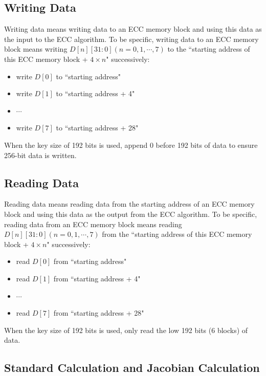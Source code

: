 \documentclass[main\_\_EN.tex]{subfiles}
\begin{document}
\subsection{Writing Data}

Writing data means writing data to an ECC memory block and using this data as the input to the ECC algorithm. To be specific, writing data to an ECC memory block means writing $D[n][31:0] (n=0, 1, \cdots, 7)$ to the ``starting address of this ECC memory block + $4 \times n$" successively:

\begin{itemize}
    \item write $D[0]$ to ``starting address"
    \item write $D[1]$ to ``starting address + 4"
    \item $\cdots$
    \item write $D[7]$ to ``starting address + 28"
\end{itemize}

\begin{tiplisting}
When the key size of 192 bits is used, append 0 before 192 bits of data to ensure 256-bit data is written.
\end{tiplisting}

\subsection{Reading Data}

Reading data means reading data from the starting address of an ECC memory block and using this data as the output from the ECC algorithm. To be specific, reading data from an ECC memory block means reading $D[n][31:0] (n=0, 1, \cdots, 7)$ from the ``starting address of this ECC memory block + $4 \times n$" successively:
\begin{itemize}
    \item read $D[0]$ from ``starting address"
    \item read $D[1]$ from ``starting address + 4"
    \item $\cdots$
    \item read $D[7]$ from ``starting address + 28"
\end{itemize}

\begin{tiplisting}
When the key size of 192 bits is used, only read the low 192 bits (6 blocks) of data.
\end{tiplisting}


\subsection{Standard Calculation and Jacobian Calculation}
\end{document}
